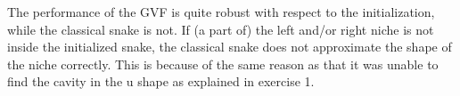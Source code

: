 \documentclass{article}
\begin{document}
The performance of the GVF is quite robust with respect to the initialization, while the classical snake is not. If (a part of) the left and/or right niche is not inside the initialized snake, the classical snake does not approximate the shape of the niche correctly. This is because of the same reason as that it was unable to find the cavity in the u shape as explained in exercise 1.

\subsection{}
\end{document}
